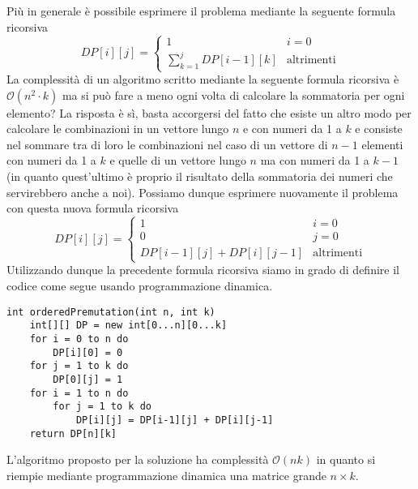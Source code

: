 \documentclass[../cheatSheetAlgoritmi.tex]{subfiles}
\begin{document}
Più in generale è possibile esprimere il problema mediante la seguente formula ricorsiva  
\begin{equation*}
  	DP[i][j]=\begin{cases}
  		1 & \text{$i = 0$}\\
  		\sum_{k = 1}^{j}DP[i-1][k] & \text{altrimenti}
  	\end{cases}
\end{equation*}
La complessità di un algoritmo scritto mediante la seguente formula ricorsiva è $\mathcal{O}(n^{2} \cdot k)$ ma si può fare a meno ogni volta di calcolare la sommatoria per ogni elemento? La risposta è sì, basta accorgersi del fatto che esiste un altro modo per calcolare le combinazioni in un vettore lungo $n$ e con numeri da 1 a $k$ e consiste nel sommare tra di loro le combinazioni nel caso di un vettore di $n-1$ elementi con numeri da 1 a $k$ e quelle di un vettore lungo $n$ ma con numeri da 1 a $k-1$ (in quanto quest'ultimo è proprio il risultato della sommatoria dei numeri che servirebbero anche a noi). Possiamo dunque esprimere nuovamente il problema con questa nuova formula ricorsiva
\begin{equation*}
  	DP[i][j]=\begin{cases}
  		1 & \text{$i = 0$}\\
  		0 & \text{$j = 0$}\\
  		DP[i-1][j] + DP[i][j-1] & \text{altrimenti}
  	\end{cases}
\end{equation*}
Utilizzando dunque la precedente formula ricorsiva siamo in grado di definire il codice come segue usando programmazione dinamica.
\begin{lstlisting}[caption=Conteggio Permutazioni Ordinate]
int orderedPremutation(int n, int k)
	int[][] DP = new int[0...n][0...k]
	for i = 0 to n do
		DP[i][0] = 0
	for j = 1 to k do
		DP[0][j] = 1
	for i = 1 to n do
		for j = 1 to k do
			DP[i][j] = DP[i-1][j] + DP[i][j-1]
	return DP[n][k]
\end{lstlisting}
L'algoritmo proposto per la soluzione ha complessità $\mathcal{O}(nk)$ in quanto si riempie mediante programmazione dinamica una matrice grande $n \times k$.
 
\end{document}
